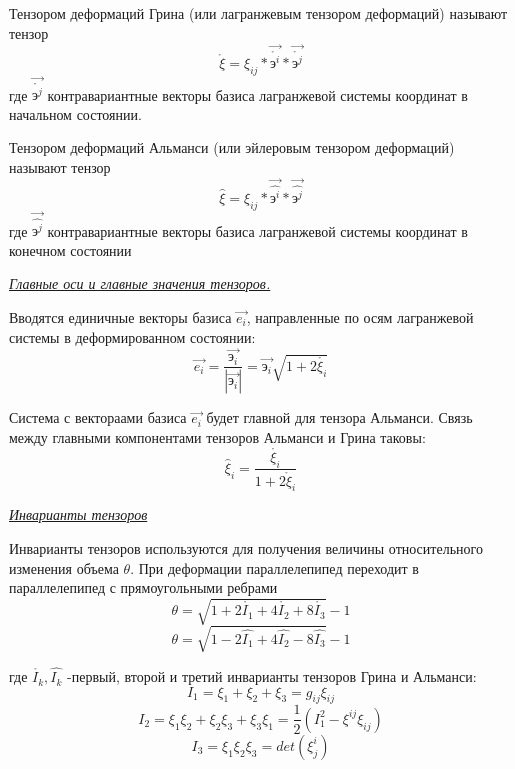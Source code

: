Тензором деформаций Грина (или лагранжевым тензором деформаций) называют тензор $$\mathring{\xi}=\xi_{ij}*\overrightarrow{\mathring{\text{э}^i}}*\overrightarrow{\mathring{\text{э}^j}}$$ где $\overrightarrow{\mathring{\text{э}^j}}$ контравариантные векторы базиса лагранжевой системы координат в начальном состоянии. 

Тензором деформаций Альманси (или эйлеровым тензором деформаций) называют тензор $$\hat{\xi}=\xi_{ij}*\overrightarrow{\hat{\text{э}^i}}*\overrightarrow{\hat{\text{э}^j}}$$ где $\overrightarrow{\hat{\text{э}^j}}$ контравариантные векторы базиса лагранжевой системы координат в конечном состоянии


\begin{center}
	\textit{\underline{Главные оси и главные значения тензоров.}}
\end{center}

Вводятся единичные векторы базиса $\overrightarrow{e_i}$, направленные по осям лагранжевой системы в деформированном состоянии:
$$\overrightarrow{e_i}=\frac{\overrightarrow{\text{э}_{i}}}{|\overrightarrow{\text{э}_{i}}|}=\overrightarrow{\text{э}_{i}}\sqrt{1+2\mathring{\xi_i}}$$

Система с вектораами базиса $\overrightarrow{e_i}$ будет главной для тензора Альманси. 
Связь между главными компонентами тензоров Альманси и Грина таковы:
$$\hat\xi_i=\frac{\mathring{\xi_i}}{1+2\mathring\xi_i}$$

\begin{center}
	\textit{\underline{Инварианты тензоров}}
\end{center}
Инварианты тензоров используются для получения величины относительного изменения объема $\theta$.
При деформации параллелепипед переходит в параллелепипед с прямоугольными ребрами 
$$\theta=\sqrt{1+2\mathring{I_1}+4\mathring{I_2}+8\mathring{I_3}}-1$$
$$\theta=\sqrt{1-2\hat{I_1}+4\hat{I_2}-8\hat{I_3}}-1$$

где $\mathring{I_k},\hat{I_k}$ -первый, второй и третий инварианты тензоров Грина и Альманси:
$$I_1=\xi_1+\xi_2+\xi_3=g_{ij}\xi_{ij}$$
$$I_2=\xi_1\xi_2+\xi_2\xi_3+\xi_3\xi_1=\frac{1}{2}(I_1^2-\xi^{ij}\xi_{ij})$$
$$I_3=\xi_1\xi_2\xi_3=det(\xi_j^i)$$

